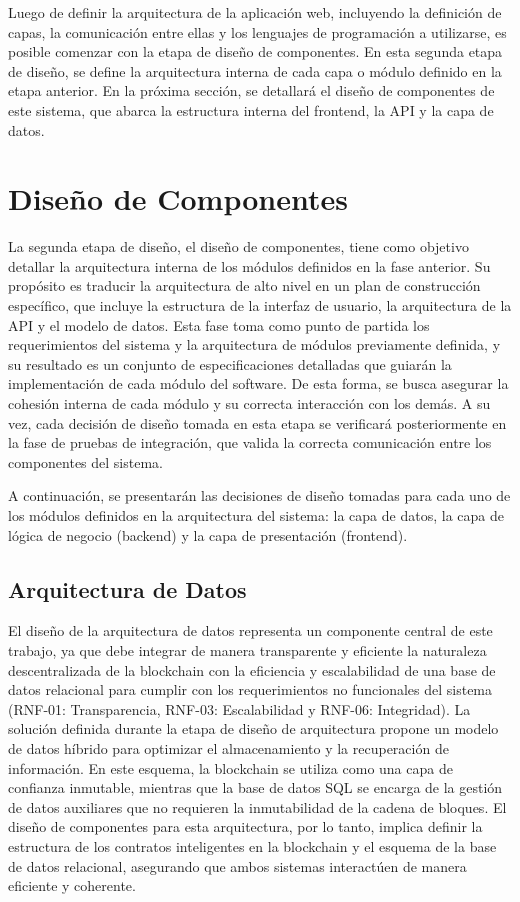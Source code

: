 Luego de definir la arquitectura de la aplicación web, incluyendo la definición de capas, la comunicación entre ellas y los lenguajes de programación a utilizarse, es posible comenzar con la etapa de diseño de componentes. En esta segunda etapa de diseño, se define la arquitectura interna de cada capa o módulo definido en la etapa anterior. En la próxima sección, se detallará el diseño de componentes de este sistema, que abarca la estructura interna del frontend, la API y la capa de datos.

\section{Diseño de Componentes}
\label{sec:components-design}

La segunda etapa de diseño, el diseño de componentes, tiene como objetivo detallar la arquitectura interna de los módulos definidos en la fase anterior. Su propósito es traducir la arquitectura de alto nivel en un plan de construcción específico, que incluye la estructura de la interfaz de usuario, la arquitectura de la API y el modelo de datos. Esta fase toma como punto de partida los requerimientos del sistema y la arquitectura de módulos previamente definida, y su resultado es un conjunto de especificaciones detalladas que guiarán la implementación de cada módulo del software. De esta forma, se busca asegurar la cohesión interna de cada módulo y su correcta interacción con los demás. A su vez, cada decisión de diseño tomada en esta etapa se verificará posteriormente en la fase de pruebas de integración, que valida la correcta comunicación entre los componentes del sistema.

A continuación, se presentarán las decisiones de diseño tomadas para cada uno de los módulos definidos en la arquitectura del sistema: la capa de datos, la capa de lógica de negocio (backend) y la capa de presentación (frontend).

\subsection{Arquitectura de Datos}

El diseño de la arquitectura de datos representa un componente central de este trabajo, ya que debe integrar de manera transparente y eficiente la naturaleza descentralizada de la blockchain con la eficiencia y escalabilidad de una base de datos relacional para cumplir con los requerimientos no funcionales del sistema (RNF-01: Transparencia, RNF-03: Escalabilidad y RNF-06: Integridad). La solución definida durante la etapa de diseño de arquitectura propone un modelo de datos híbrido para optimizar el almacenamiento y la recuperación de información. En este esquema, la blockchain se utiliza como una capa de confianza inmutable, mientras que la base de datos SQL se encarga de la gestión de datos auxiliares que no requieren la inmutabilidad de la cadena de bloques. El diseño de componentes para esta arquitectura, por lo tanto, implica definir la estructura de los contratos inteligentes en la blockchain y el esquema de la base de datos relacional, asegurando que ambos sistemas interactúen de manera eficiente y coherente.

